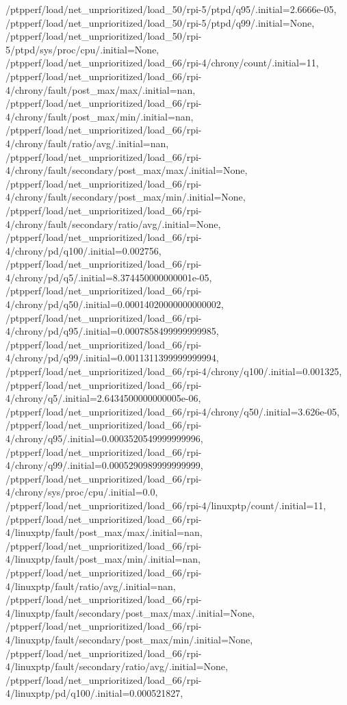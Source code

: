 {    /ptpperf/load/net_unprioritized/load_50/rpi-5/ptpd/q95/.initial=2.6666e-05,
    /ptpperf/load/net_unprioritized/load_50/rpi-5/ptpd/q99/.initial=None,
    /ptpperf/load/net_unprioritized/load_50/rpi-5/ptpd/sys/proc/cpu/.initial=None,
    /ptpperf/load/net_unprioritized/load_66/rpi-4/chrony/count/.initial=11,
    /ptpperf/load/net_unprioritized/load_66/rpi-4/chrony/fault/post_max/max/.initial=nan,
    /ptpperf/load/net_unprioritized/load_66/rpi-4/chrony/fault/post_max/min/.initial=nan,
    /ptpperf/load/net_unprioritized/load_66/rpi-4/chrony/fault/ratio/avg/.initial=nan,
    /ptpperf/load/net_unprioritized/load_66/rpi-4/chrony/fault/secondary/post_max/max/.initial=None,
    /ptpperf/load/net_unprioritized/load_66/rpi-4/chrony/fault/secondary/post_max/min/.initial=None,
    /ptpperf/load/net_unprioritized/load_66/rpi-4/chrony/fault/secondary/ratio/avg/.initial=None,
    /ptpperf/load/net_unprioritized/load_66/rpi-4/chrony/pd/q100/.initial=0.002756,
    /ptpperf/load/net_unprioritized/load_66/rpi-4/chrony/pd/q5/.initial=8.374450000000001e-05,
    /ptpperf/load/net_unprioritized/load_66/rpi-4/chrony/pd/q50/.initial=0.00014020000000000002,
    /ptpperf/load/net_unprioritized/load_66/rpi-4/chrony/pd/q95/.initial=0.0007858499999999985,
    /ptpperf/load/net_unprioritized/load_66/rpi-4/chrony/pd/q99/.initial=0.0011311399999999994,
    /ptpperf/load/net_unprioritized/load_66/rpi-4/chrony/q100/.initial=0.001325,
    /ptpperf/load/net_unprioritized/load_66/rpi-4/chrony/q5/.initial=2.6434500000000005e-06,
    /ptpperf/load/net_unprioritized/load_66/rpi-4/chrony/q50/.initial=3.626e-05,
    /ptpperf/load/net_unprioritized/load_66/rpi-4/chrony/q95/.initial=0.0003520549999999996,
    /ptpperf/load/net_unprioritized/load_66/rpi-4/chrony/q99/.initial=0.0005290989999999999,
    /ptpperf/load/net_unprioritized/load_66/rpi-4/chrony/sys/proc/cpu/.initial=0.0,
    /ptpperf/load/net_unprioritized/load_66/rpi-4/linuxptp/count/.initial=11,
    /ptpperf/load/net_unprioritized/load_66/rpi-4/linuxptp/fault/post_max/max/.initial=nan,
    /ptpperf/load/net_unprioritized/load_66/rpi-4/linuxptp/fault/post_max/min/.initial=nan,
    /ptpperf/load/net_unprioritized/load_66/rpi-4/linuxptp/fault/ratio/avg/.initial=nan,
    /ptpperf/load/net_unprioritized/load_66/rpi-4/linuxptp/fault/secondary/post_max/max/.initial=None,
    /ptpperf/load/net_unprioritized/load_66/rpi-4/linuxptp/fault/secondary/post_max/min/.initial=None,
    /ptpperf/load/net_unprioritized/load_66/rpi-4/linuxptp/fault/secondary/ratio/avg/.initial=None,
    /ptpperf/load/net_unprioritized/load_66/rpi-4/linuxptp/pd/q100/.initial=0.000521827,
}
